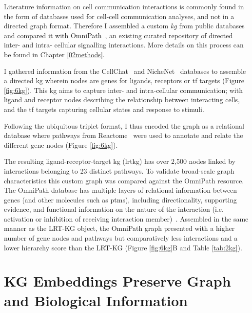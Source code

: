 Literature information on cell communication interactions is commonly found in the form of databases used for cell-cell communication analyses, and not in a directed graph format. Therefore I assembled a custom \emph{kg} from public databases and compared it with OmniPath~\cite{turei_integrated_2021}, an existing curated repository of directed inter- and intra- cellular signalling interactions. More details on this process can be found in Chapter \ref{02methods}.

I gathered information from the CellChat~\cite{jin_inference_2021} and NicheNet~\cite{browaeys_nichenet_2020} databases to assemble a directed \acrshort{kg} wherein nodes are genes for ligands, receptors or \acrfull{tf} targets (Figure \ref{fig:6kg}). This \acrshort{kg} aims to capture inter- and intra-cellular communication; with ligand and receptor nodes describing the relationship between interacting cells, and the \acrshort{tf} targets capturing cellular states and response to stimuli.

Following the ubiquitous triplet format, I thus encoded the graph as a relational database where pathways from Reactome~\cite{gillespie_reactome_2022} were used to annotate and relate the different gene nodes (Figure \ref{fig:6kg}).

The resulting ligand-receptor-target \acrshort{kg} (\acrshort{lrtkg}) has over 2,500 nodes linked by interactions belonging to 23 distinct pathways. To validate broad-scale graph characteristics this custom graph was compared against the OmniPath resource.
The OmniPath database has multiple layers of relational information between genes (and other molecules such as \acrshort{ptm}s), including directionality, supporting evidence, and functional information on the nature of the interaction (i.e. activation or inhibition of receiving interaction member)~\cite{turei_integrated_2021}. Assembled in the same manner as the LRT-KG object, the OmniPath graph presented with a higher number of gene nodes and pathways but comparatively less interactions  and a lower hierarchy score than the LRT-KG (Figure \ref{fig:6kg}B and Table \ref{tab:2kg}).

\newpage
\section{KG Embeddings Preserve Graph and Biological Information}

